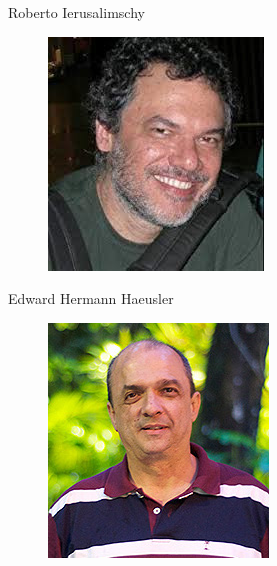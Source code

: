 \documentclass{article}
\begin{document}
\begin{description}
\item[Roberto Ierusalimschy]
  \begin{center}
    \includegraphics[width=\picwidth]{pics/roberto.jpg}
  \end{center}

\item[Edward Hermann Haeusler]
  \begin{center}
    \includegraphics[width=\picwidth]{pics/hermann.jpg}
  \end{center}
\end{description}
\end{document}
